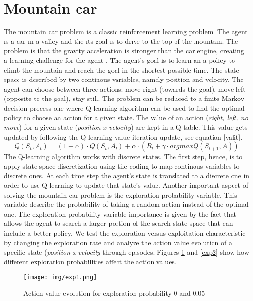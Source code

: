 \documentclass[runningheads]{llncs}
\begin{document}
\section{Mountain car}
The mountain car problem is a classic reinforcement learning
problem. The agent is a car in a valley and the its goal is to drive
to the top of the mountain. The problem is that the gravity
acceleration is stronger than the car engine, creating a learning
challenge for the agent \cite{rlbook}. The agent's goal is to learn an
a policy to climb the mountain and reach the goal in the shortest
possible time. The state space is described by two continous
variables, namely position and velocity. The agent can choose between
three actions: move right (towards the goal), move left (opposite
to the goal), stay still. The problem can be reduced to a finite
Markov decision process one where Q-learning algorithm can be used to
find the optimal policy to choose an action for a given state. The
value of an action (\textit{right, left, no move}) for a given state
(\textit{position x velocity}) are kept in a Q-table. This value gets
updated by following the Q-learning value iteration update, see equation \ref{valit}.
\begin{equation}\label{valit}
Q(S_t, A_t) = (1 - \alpha) \cdot Q(S_t, A_t) + \alpha \cdot (R_t + \gamma
\cdot argmaxQ(S_{t+1}, A)) 
\end{equation}
The Q-learning algorithm works with discrete states. The first step,
hence, is to apply state space discretization using tile coding to map
continous variables to discrete ones. At each time step the agent's
state is translated to a discrete one in order to use Q-learning to
update that state's value. Another important aspect of solving the
mountain car problem is the exploration probability variable. This
variable describe the probability of taking a random action instead of
the optimal one. The exploration probability variable importance is
given by the fact that allows the agent to search a larger portion of
the search state space that can include a better policy. We test the
exploration versus exploitation characteristic by changing the
exploration rate and analyze the action value evolution of a specific state
(\textit{position x velocity} through episodes. Figures \ref{exp1} and
\ref{exp2} show how different exploration probabilities affect the
action values. 
\begin{figure}
\texttt{[image: img/exp1.png]}
\caption{Action value evolution for exploration probability 0 and 0.05} \label{exp1}
\end{figure}
\end{document}
